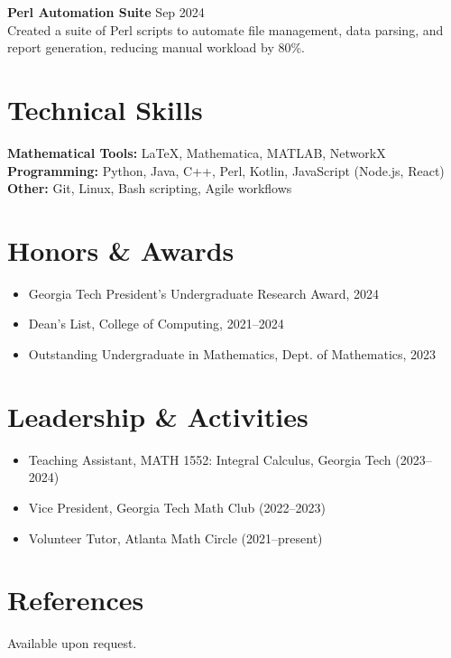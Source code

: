 \noindent
\textbf{Perl Automation Suite} \hfill Sep 2024\\
Created a suite of Perl scripts to automate file management, data parsing, and report generation, reducing manual workload by 80\%.

\section*{Technical Skills}
\noindent
\textbf{Mathematical Tools:} LaTeX, Mathematica, MATLAB, NetworkX\\
\textbf{Programming:} Python, Java, C++, Perl, Kotlin, JavaScript (Node.js, React)\\
\textbf{Other:} Git, Linux, Bash scripting, Agile workflows

\section*{Honors \& Awards}
\begin{itemize}
  \item Georgia Tech President's Undergraduate Research Award, 2024
  \item Dean's List, College of Computing, 2021--2024
  \item Outstanding Undergraduate in Mathematics, Dept. of Mathematics, 2023
\end{itemize}

\section*{Leadership \& Activities}
\begin{itemize}
  \item Teaching Assistant, MATH 1552: Integral Calculus, Georgia Tech (2023--2024)
  \item Vice President, Georgia Tech Math Club (2022--2023)
  \item Volunteer Tutor, Atlanta Math Circle (2021--present)
\end{itemize}

\section*{References}
Available upon request.